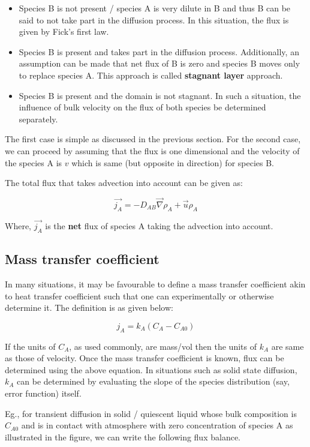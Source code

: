 \begin{itemize}
\item Species B is not present / species A is very dilute in B and thus B can be
said to not take part in the diffusion process. In this situation, the flux is
given by Fick's first law.
\item Species B is present and takes part in the diffusion process.
Additionally, an assumption can be made that net flux of B is zero and species B
moves only to replace species A. This approach is called \textbf{stagnant layer}
approach.
\item Species B is present and the domain is not stagnant. In such a situation,
the influence of bulk velocity on the flux of both species be determined
separately.
\end{itemize}

The first case is simple as discussed in the previous section. For the second
case, we can proceed by assuming that the flux is one dimensional and the
velocity of the species A is $v$ which is same (but opposite in direction) for
species B. 

The total flux that takes advection into account can be
given as:

$$ \boxed{
 \vec{j_A} = -D_{AB}\vec{\nabla} \rho_A + \vec{u} \rho_A 
}$$

Where, $\vec{j_A}$ is the \textbf{net} flux of species A taking the advection
into account.

\subsection{Mass transfer coefficient}

In many situations, it may be favourable to define a mass transfer coefficient
akin to heat transfer coefficient such that one can experimentally or otherwise
determine it. The definition is as given below:

$$ j_A = k_A \left( C_A - C_{A0} \right) $$

If the units of $C_A$, as used commonly, are mass/vol then the units of $k_A$
are same as those of velocity. Once the mass transfer coefficient is known, flux
can be determined using the above equation. In situations such as solid state
diffusion, $k_A$ can be determined by evaluating the slope of the species
distribution (say, error function) itself.

Eg., for transient diffusion in solid / quiescent liquid whose bulk composition
is $C_{A0}$ and is in contact with atmosphere with zero concentration of species
A as illustrated in the figure, we can write the following flux balance.

